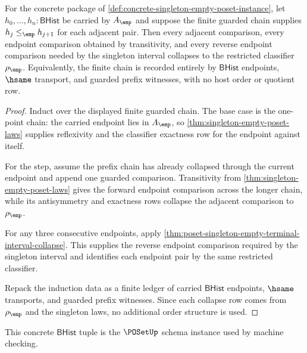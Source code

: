 \begin{theorem}
\label{thm:poset-prefix-chain-collapse}
For the concrete package of
\autoref{def:concrete-singleton-empty-poset-instance}, let
$h_0,\ldots,h_n:\mathsf{BHist}$ be carried by $A_{\emp}$ and suppose the
finite guarded chain supplies $h_j\le_{\emp}h_{j+1}$ for each adjacent pair.
Then every adjacent comparison, every endpoint comparison obtained by
transitivity, and every reverse endpoint comparison needed by the singleton
interval collapses to the restricted classifier $\rho_{\emp}$. Equivalently,
the finite chain is recorded entirely by $\mathsf{BHist}$ endpoints, $\hsame$
transport, and guarded prefix witnesses, with no host order or quotient row.
\end{theorem}
\begin{proof}
Induct over the displayed finite guarded chain. The base case is the
one-point chain: the carried endpoint lies in $A_{\emp}$, so
\autoref{thm:singleton-empty-poset-laws} supplies reflexivity and the
classifier exactness row for the endpoint against itself.

For the step, assume the prefix chain has already collapsed through the
current endpoint and append one guarded comparison. Transitivity from
\autoref{thm:singleton-empty-poset-laws} gives the forward endpoint
comparison across the longer chain, while its antisymmetry and exactness rows
collapse the adjacent comparison to $\rho_{\emp}$.

For any three consecutive endpoints, apply
\autoref{thm:poset-singleton-empty-terminal-interval-collapse}. This supplies
the reverse endpoint comparison required by the singleton interval and
identifies each endpoint pair by the same restricted classifier.

Repack the induction data as a finite ledger of carried $\mathsf{BHist}$
endpoints, $\hsame$ transports, and guarded prefix witnesses. Since each
collapse row comes from $\rho_{\emp}$ and the singleton laws, no additional
order structure is used.
\end{proof}

This concrete $\mathsf{BHist}$ tuple is the $\POSetUp$ schema instance used by
machine checking.

